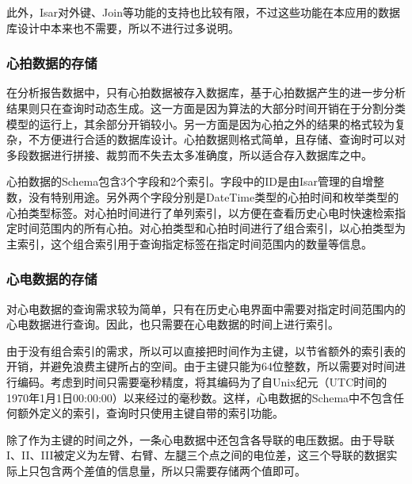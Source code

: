 此外，Isar对外键、Join等功能的支持也比较有限，不过这些功能在本应用的数据库设计中本来也不需要，所以不进行过多说明。

\subsubsection{心拍数据的存储}\label{subsubsec:beat-storage}

在分析报告数据中，只有心拍数据被存入数据库，基于心拍数据产生的进一步分析结果则只在查询时动态生成。这一方面是因为算法的大部分时间开销在于分割分类模型的运行上，其余部分开销较小。另一方面是因为心拍之外的结果的格式较为复杂，不方便进行合适的数据库设计。心拍数据则格式简单，且存储、查询时可以对多段数据进行拼接、裁剪而不失去太多准确度，所以适合存入数据库之中。

心拍数据的Schema包含3个字段和2个索引。字段中的ID是由Isar管理的自增整数，没有特别用途。另外两个字段分别是DateTime类型的心拍时间和枚举类型的心拍类型标签。对心拍时间进行了单列索引，以方便在查看历史心电时快速检索指定时间范围内的所有心拍。对心拍类型和心拍时间进行了组合索引，以心拍类型为主索引，这个组合索引用于查询指定标签在指定时间范围内的数量等信息。

\subsubsection{心电数据的存储}\label{subsubsec:point-storage}

对心电数据的查询需求较为简单，只有在历史心电界面中需要对指定时间范围内的心电数据进行查询。因此，也只需要在心电数据的时间上进行索引。

由于没有组合索引的需求，所以可以直接把时间作为主键，以节省额外的索引表的开销，并避免浪费主键所占的空间。由于主键只能为64位整数，所以需要对时间进行编码。考虑到时间只需要毫秒精度，将其编码为了自Unix纪元（UTC时间的1970年1月1日00:00:00）以来经过的毫秒数。这样，心电数据的Schema中不包含任何额外定义的索引，查询时只使用主键自带的索引功能。

除了作为主键的时间之外，一条心电数据中还包含各导联的电压数据。由于导联I、II、III被定义为左臂、右臂、左腿三个点之间的电位差，这三个导联的数据实际上只包含两个差值的信息量，所以只需要存储两个值即可。
